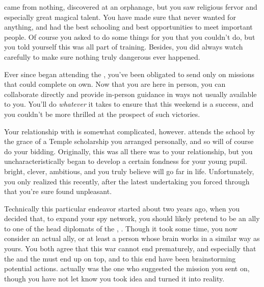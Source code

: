 \documentclass[char]{GL2020}
\begin{document}
\cScholarship{} came from nothing, discovered at an orphanage, but you saw \cScholarship{\their} religious fervor and especially great magical talent. You have made sure that \cScholarship {\they} never wanted for anything, and had the best schooling and best opportunities to meet important people. Of course you asked \cScholarship{\them} to do some things for you that you couldn’t do, but you told yourself this was all part of \cScholarship{\their} training. Besides, you did always watch carefully to make sure nothing truly dangerous ever happened.

Ever since \cScholarship{} began attending the \pSchool{}, you've been obligated to send \cScholarship{\them} only on missions that \cScholarship{\they} could complete on  \cScholarship{\their} own. Now that you are here in person, you can collaborate directly and provide in-person guidance in ways not usually available to you. You'll do \emph{whatever} it takes to ensure that this weekend is a success, and you couldn't be more thrilled at the prospect of such victories.

Your relationship with \cScholarship{} is somewhat complicated, however. \cScholarship{} attends the school by the grace of a Temple scholarship you arranged personally, and so will of course do your bidding. Originally, this was all there was to your relationship, but you uncharacteristically began to develop a certain fondness for your young pupil. \cScholarship{\Theyare} bright, clever, ambitious, and you truly believe \cScholarship{\they} will go far in life. Unfortunately, you only realized this recently, after the latest undertaking you forced \cScholarship{\them} through that you're sure \cScholarship{\they} found unpleasant.  

Technically this particular endeavor started about two years ago, when you decided that, to expand your spy network, you should likely pretend to be an ally to one of the head diplomats of the \pFarm{}, \cEvil{\intro}. Though it took some time, you now consider \cEvil{} an actual ally, or at least a person whose brain works in a similar way as yours. You both agree that this war cannot end prematurely, and especially that the \pFarm{} and the \pTech{} must end up on top, and to this end have been brainstorming potential actions. \cEvil{} actually was the one who suggested the mission you sent \cScholarship{} on, though you have not let \cEvil{\them} know you took \cEvil{\their} idea and turned it into reality.  
\end{document}
